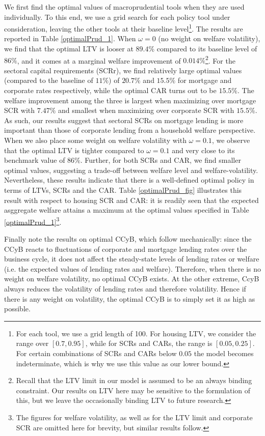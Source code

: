 \documentclass[12pt]{article}
\numberwithin{equation}{section}
\begin{document}
We first find the optimal values of macroprudential tools when they are used individually. To this end, we use a grid search for each policy tool under consideration, leaving the other tools at their baseline level\footnote{For each tool, we use a grid length of 100. For housing LTV, we consider the range over $[0.7,0.95]$, while for SCRs and CARs, the range is $[0.05,0.25]$. For certain combinations of SCRs and CARs below $0.05$ the model becomes indeterminate, which is why we use this value as our lower bound.}. The results are reported in Table \ref{optimalPrud_1}. When $\omega=0$ (no weight on welfare volatility), we find that the optimal LTV is looser at $89.4 \%$ compared to its baseline level of $86 \%$, and it comes at a marginal welfare improvement of $0.014 \%$\footnote{Recall that the LTV limit in our model is assumed to be an always binding constraint. Our results on LTV here may be sensitive to the formulation of this, but we leave the occasionally binding LTV to future research.}. For the sectoral capital requirements (SCRr), we find relatively large optimal values (compared to the baseline of $11 \%$) of $20.7 \% $ and $15.5 \%$ for mortgage and corporate rates respectively, while the optimal CAR turns out to be $15.5 \%$. The welfare improvement among the three is largest when maximizing over mortgage SCR with $7.47 \%$ and smallest when maximizing over corporate SCR with  $15.5 \%$. As such, our results suggest that sectoral SCRs on mortgage lending is more important than those of corporate lending from a household welfare perspective. When we also place some weight on welfare volatility with $\omega=0.1$, we observe that the optimal LTV is tighter compared to $\omega=0.1$ and very close to its benchmark value of $86 \%$. Further, for both SCRs and CAR, we find smaller optimal values, suggesting a trade-off between welfare level and welfare-volatility. Nevertheless, these results indicate that there is a well-defined optimal policy in terms of LTVs, SCRs and the CAR. Table \ref{optimalPrud_fig} illustrates this result with respect to housing SCR and CAR: it is readily seen that the expected asggregate welfare  attains a maximum at the optimal values specified in Table \ref{optimalPrud_1}\footnote{The figures for welfare volatility, as well as for the LTV limit and corporate SCR are omitted here for brevity, but similar results follow.}.

Finally note the results on optimal CCyB, which follow mechanically: since the CCyB reacts to fluctuations of corporate and mortgage lending rates over the business cycle, it does not affect the steady-state levels of lending rates or welfare (i.e. the expected values of lending rates and welfare). Therefore, when there is no weight on welfare volatility, no optimal CCyB exists. At the other extreme, CcyB always reduces the volatility of lending rates and therefore volatility. Hence if there is any weight on volatility, the optimal CCyB is to simply set it as high as possible. 
\end{document}
